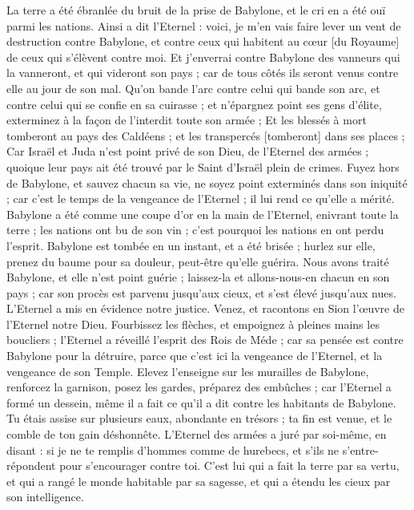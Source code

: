\begin{multicols}{2}
La terre a été ébranlée du bruit de la prise de Babylone, et le cri en a été ouï parmi les nations.
\VerseOne{}Ainsi a dit l'Eternel : voici, je m'en vais faire lever un vent de destruction contre Babylone, et contre ceux qui habitent au cœur [du Royaume] de ceux qui s'élèvent contre moi.
Et j'enverrai contre Babylone des vanneurs qui la vanneront, et qui videront son pays ; car de tous côtés ils seront venus contre elle au jour de son mal.
Qu'on bande l'arc contre celui qui bande son arc, et contre celui qui se confie en sa cuirasse ; et n'épargnez point ses gens d'élite, exterminez à la façon de l'interdit toute son armée ;
Et les blessés à mort tomberont au pays des Caldéens ; et les transpercés [tomberont] dans ses places ;
Car Israël et Juda n'est point privé de son Dieu, de l'Eternel des armées ; quoique leur pays ait été trouvé par le Saint d'Israël plein de crimes.
Fuyez hors de Babylone, et sauvez chacun sa vie, ne soyez point exterminés dans son iniquité ; car c'est le temps de la vengeance de l'Eternel ; il lui rend ce qu'elle a mérité.
Babylone a été comme une coupe d'or en la main de l'Eternel, enivrant toute la terre ; les nations ont bu de son vin ; c'est pourquoi les nations en ont perdu l'esprit.
Babylone est tombée en un instant, et a été brisée ; hurlez sur elle, prenez du baume pour sa douleur, peut-être qu'elle guérira.
Nous avons traité Babylone, et elle n'est point guérie ; laissez-la et allons-nous-en chacun en son pays ; car son procès est parvenu jusqu’aux cieux, et s'est élevé jusqu’aux nues.
L'Eternel a mis en évidence notre justice. Venez, et racontons en Sion l'œuvre de l'Eternel notre Dieu.
Fourbissez les flèches, et empoignez à pleines mains les boucliers ; l'Eternel a réveillé l'esprit des Rois de Méde ; car sa pensée est contre Babylone pour la détruire, parce que c'est ici la vengeance de l'Eternel, et la vengeance de son Temple.
Elevez l'enseigne sur les murailles de Babylone, renforcez la garnison, posez les gardes, préparez des embûches ; car l'Eternel a formé un dessein, même il a fait ce qu'il a dit contre les habitants de Babylone.
Tu étais assise sur plusieurs eaux, abondante en trésors ; ta fin est venue, et le comble de ton gain déshonnête.
L'Eternel des armées a juré par soi-même, en disant : si je ne te remplis d'hommes comme de hurebecs, et s'ils ne s'entre-répondent pour s'encourager contre toi.
C'est lui qui a fait la terre par sa vertu, et qui a rangé le monde habitable par sa sagesse, et qui a étendu les cieux par son intelligence.

\end{multicols}
